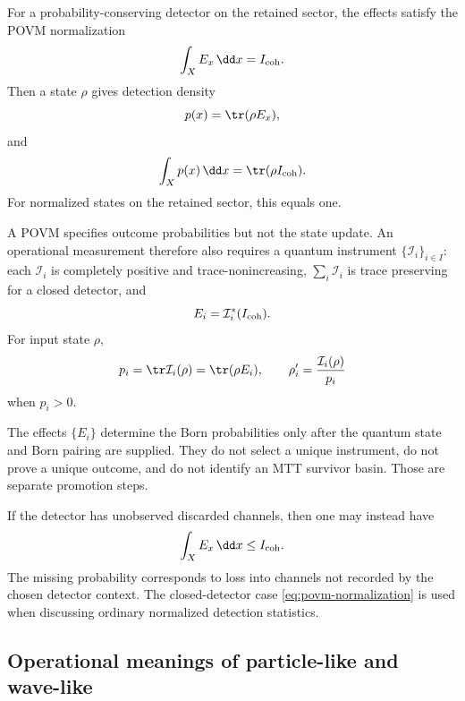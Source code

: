 \documentclass[11pt]{article}
\begin{document}
For a probability-conserving detector on the retained sector, the effects satisfy the POVM
normalization
\begin{equation}
  \int_X E_x\,\dd x
  =
  I_{\rm coh}.
  \label{eq:povm-normalization}
\end{equation}
Then a state \(\rho\) gives detection density
\begin{equation}
  p(x)=\tr(\rho E_x),
\end{equation}
and
\begin{equation}
  \int_X p(x)\,\dd x
  =
  \tr(\rho I_{\rm coh}).
\end{equation}
For normalized states on the retained sector, this equals one.

\begin{definition}
\label{def:instrument-completion}
A POVM specifies outcome probabilities but not the state update. An operational
measurement therefore also requires a quantum instrument
\(\{\mathcal I_i\}_{i\in I}\): each \(\mathcal I_i\) is completely positive and
trace-nonincreasing, \(\sum_i\mathcal I_i\) is trace preserving for a closed detector, and
\[
  E_i=\mathcal I_i^\ast(I_{\rm coh}).
\]
For input state \(\rho\),
\[
  p_i=\tr\mathcal I_i(\rho)=\tr(\rho E_i),
  \qquad
  \rho_i'=\frac{\mathcal I_i(\rho)}{p_i}
\]
when \(p_i>0\).
\end{definition}

\begin{remark}
The effects \(\{E_i\}\) determine the Born probabilities only after the quantum state and
Born pairing are supplied. They do not select a unique instrument, do not prove a unique
outcome, and do not identify an MTT survivor basin. Those are separate promotion steps.
\end{remark}

\begin{remark}
\label{rem:open-detectors}
If the detector has unobserved discarded channels, then one may instead have
\begin{equation}
  \int_X E_x\,\dd x
  \le
  I_{\rm coh}.
\end{equation}
The missing probability corresponds to loss into channels not recorded by the chosen detector
context. The closed-detector case \eqref{eq:povm-normalization} is used when discussing
ordinary normalized detection statistics.
\end{remark}

\subsection{Operational meanings of particle-like and wave-like}
\label{subsec:operational-meanings}
\end{document}
